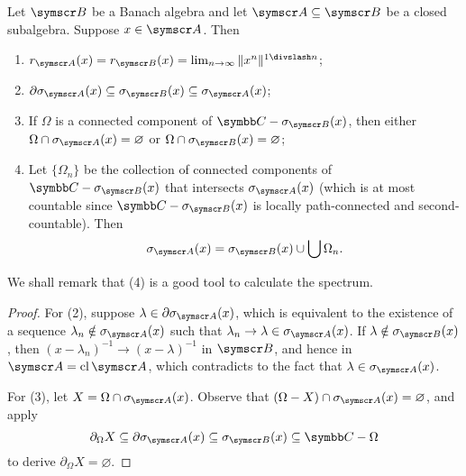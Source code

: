 \begin{proposition}
  Let $\BA B$ be a Banach algebra and let $\BA A\subseteq \BA B$ be a closed subalgebra. Suppose $x\in\BA A$. Then
  \begin{enumerate}
    \item $r_{\BA A}(x) = r_{\BA B}(x) = \lim_{n\to\infty}\NORM{x^n}^{1\DIV n}$;
    \item $\partial\sigma_{\BA A}(x)\subseteq\sigma_{\BA B}(x)\subseteq \sigma_{\BA A}(x)$;
    \item If $\Omega$ is a connected component of $\CC - \sigma_{\BA B}(x)$, then either $\Omega\cap \sigma_{\BA A}(x)=\varnothing$ or $\Omega\cap \sigma_{\BA B}(x)=\varnothing$;
    \item Let $\{\Omega_n\}$ be the collection of connected components of $\CC - \sigma_{\BA B}(x)$ that intersects $\sigma_{\BA A}(x)$ (which is at most countable since $\CC - \sigma_{\BA B}(x)$ is locally path-connected and second-countable). Then
    \begin{equation}
      \sigma_{\BA A}(x)=\sigma_{\BA B}(x)\cup\bigcup \Omega_n.
    \end{equation}
  \end{enumerate}
\end{proposition}

We shall remark that (4) is a good tool to calculate the spectrum.

\begin{proof}
  For (2), suppose $\lambda\in\partial\sigma_{\BA A}(x)$, which is equivalent to the existence of a sequence $\lambda_n\notin \sigma_{\BA A}(x)$ such that $\lambda_n\to \lambda\in \sigma_{\BA A}(x)$. If $\lambda\notin \sigma_{\BA B}(x)$, then $(x-\lambda_n)^{-1}\to (x-\lambda)^{-1}$ in $\BA B$, and hence in $\BA A = \CL \BA A$, which contradicts to the fact that $\lambda\in\sigma_{\BA A}(x)$.

  For (3), let $X = \Omega\cap \sigma_{\BA A}(x)$. Observe that $(\Omega-X)\cap \sigma_{\BA A}(x)=\varnothing$, and apply
  \begin{equation*}
    \partial_\Omega X\subseteq\partial\sigma_{\BA A}(x)\subseteq\sigma_{\BA B}(x)\subseteq \CC-\Omega
  \end{equation*}
  to derive $\partial_\Omega X = \varnothing$.
\end{proof}

